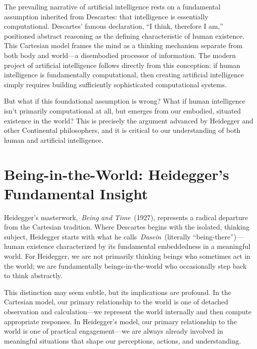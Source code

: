 \documentclass[
  Letterpaper,
]{scrbook}
\begin{document}
The prevailing narrative of artificial
intelligence rests on a
fundamental assumption inherited from Descartes: that intelligence is
essentially computational. Descartes' famous declaration, ``I think,
therefore I am,'' positioned abstract reasoning as the defining
characteristic of human existence. This Cartesian model frames the mind
as a thinking mechanism separate from both body and world---a
disembodied processor of information. The modern project of artificial
intelligence follows directly from this conception: if human
intelligence is fundamentally computational, then creating artificial
intelligence simply requires building sufficiently sophisticated
computational systems.

But what if this foundational assumption is wrong? What if human
intelligence isn't primarily computational at all, but emerges from our
embodied, situated existence in the world? This is precisely the
argument advanced by Heidegger and other Continental philosophers, and
it is critical to our understanding of both human and artificial
intelligence.

\section{\texorpdfstring{Being-in-the-World:
Heidegger's Fundamental
Insight}{Being-in-the-World: Heidegger's Fundamental Insight}}\label{being-in-the-world-heideggers-fundamental-insight}

Heidegger's masterwork,~\emph{Being and Time}~(1927), represents a
radical departure from the Cartesian tradition. Where Descartes begins
with the isolated, thinking subject, Heidegger starts with what he
calls~\emph{Dasein}~(literally
``being-there'')---human existence characterized by its fundamental
embeddedness in a meaningful world. For Heidegger, we are not primarily
thinking beings who sometimes act in the world; we are fundamentally
beings-in-the-world who occasionally step back to think abstractly.

This distinction may seem subtle, but its implications are profound. In
the Cartesian model, our primary relationship to the world is one of
detached observation and calculation---we represent the world internally
and then compute appropriate responses. In Heidegger's model, our
primary relationship to the world is one of practical engagement---we
are always already involved in meaningful situations that shape our
perceptions, actions, and understanding.
\end{document}
